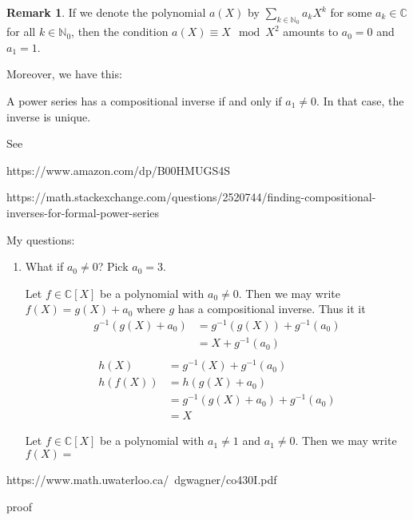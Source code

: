 \documentclass[a4paper]{article}
\theoremstyle{definition}
\newtheorem*{remark}{Remark}
\begin{document}
\begin{remark}
    If we denote the polynomial \(a(X)\) by \(\sum_{k \in \mathbb{N}_0}a_k X^k\) for some \(a_k \in \mathbb{C}\) for all \(k \in \mathbb{N}_0\), then the condition \(a(X) \equiv X \mod{X^2}\) amounts to \(a_0 = 0\) and \(a_1 = 1\).

    Moreover, we have this:

    A power series has a compositional inverse if and only if \(a_1 \neq 0\). In that case, the inverse is unique.

    See

    https://www.amazon.com/dp/B00HMUGS4S

    https://math.stackexchange.com/questions/2520744/finding-compositional-inverses-for-formal-power-series

    My questions:

    \begin{enumerate}
        \item What if \(a_0 \neq 0\)? Pick \(a_0 = 3\).

              Let \(f \in \mathbb{C}[X]\) be a polynomial with \(a_0 \neq 0\). Then we may write \(f(X) = g(X) + a_0\) where \(g\) has a compositional inverse. Thus it it
              \begin{align*}
                  g^{-1}(g(X) + a_0) & = g^{-1}(g(X)) + g^{-1}(a_0) \\
                                     & = X + g^{-1}(a_0)            \\
              \end{align*}
              \begin{align*}
                  h(X)    & = g^{-1}(X) + g^{-1}(a_0)          \\
                  h(f(X)) & = h(g(X) + a_0)                    \\
                          & = g^{-1}(g(X) + a_0) + g^{-1}(a_0) \\
                          & = X
              \end{align*}

              Let \(f \in \mathbb{C}[X]\) be a polynomial with \(a_1 \neq 1\) and \(a_1 \neq 0\). Then we may write \(f(X) =\)
    \end{enumerate}
\end{remark}

https://www.math.uwaterloo.ca/~dgwagner/co430I.pdf

proof
\end{document}

